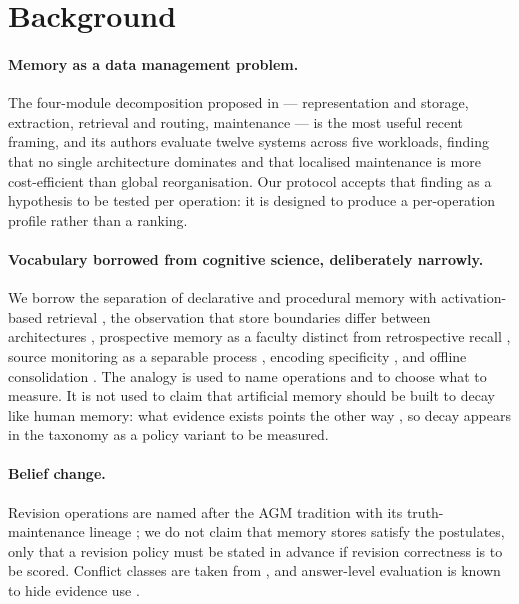 \documentclass[11pt,a4paper]{article}
\begin{document}
\section{Background}
\label{sec:background}

\paragraph{Memory as a data management problem.} The four-module decomposition proposed in
\cite{zhou2026agentnative} --- representation and storage, extraction, retrieval and routing,
maintenance --- is the most useful recent framing, and its authors evaluate twelve systems
across five workloads, finding that no single architecture dominates and that localised
maintenance is more cost-efficient than global reorganisation. Our protocol accepts that
finding as a hypothesis to be tested per operation: it is designed to produce a per-operation
profile rather than a ranking.

\paragraph{Vocabulary borrowed from cognitive science, deliberately narrowly.} We borrow the
separation of declarative and procedural memory with activation-based retrieval
\cite{laird2012soar,anderson2004actr}, the observation that store boundaries differ between
architectures \cite{laird2022actrsoar}, prospective memory as a faculty distinct from
retrospective recall \cite{einstein1990prospective}, source monitoring as a separable process
\cite{johnson1993source}, encoding specificity \cite{tulving1973encoding}, and offline
consolidation \cite{walker2004sleep}. The analogy is used to name operations and to choose what
to measure. It is not used to claim that artificial memory should be built to decay like human
memory: what evidence exists points the other way \cite{wang2026simulating}, so decay appears
in the taxonomy as a policy variant to be measured.

\paragraph{Belief change.} Revision operations are named after the AGM tradition
\cite{falakh2021agm} with its truth-maintenance lineage \cite{falkenhainer2013belief}; we do
not claim that memory stores satisfy the postulates, only that a revision policy must be stated
in advance if revision correctness is to be scored. Conflict classes are taken from
\cite{xu2024conflictsurvey,su2024conflictbank}, and answer-level evaluation is known to hide
evidence use \cite{chen2026ragwrong,schuster2026sourcepref}.
\end{document}

